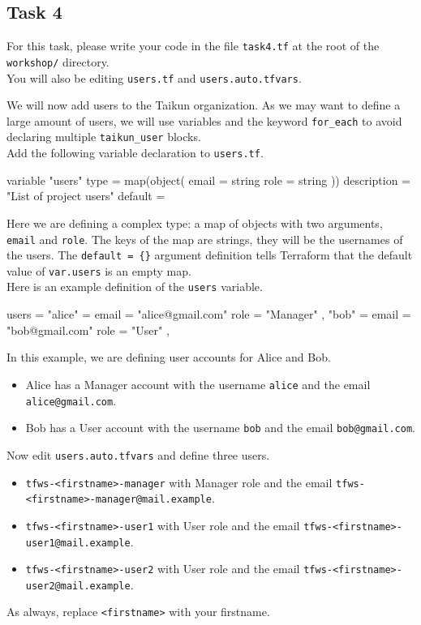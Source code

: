 \subsection{Task 4}\label{sec:task4}

\begin{note}
For this task, please write your code in the file \texttt{task4.tf}
at the root of the \texttt{workshop/} directory.\\
You will also be editing \texttt{users.tf} and \texttt{users.auto.tfvars}.
\end{note}

We will now add users to the Taikun organization.
As we may want to define a large amount of users, we will use variables
and the keyword \texttt{for\_each} to avoid declaring multiple \texttt{taikun\_user}
blocks.\\

Add the following variable declaration to \texttt{users.tf}.
\begin{tf}
variable "users" {
  type = map(object({
    email = string
    role  = string
  }))
  description = "List of project users"
  default     = {}
}
\end{tf}

Here we are defining a complex type: a map of objects with two arguments, \texttt{email} and \texttt{role}.
The keys of the map are strings, they will be the usernames of the users.
The \texttt{default = \{\}} argument definition tells Terraform that the default value of \texttt{var.users} is an empty map.\\

Here is an example definition of the \texttt{users} variable.
\begin{tf}
users = {
  "alice" = {
    email = "alice@gmail.com"
    role  = "Manager"
  },
  "bob" = {
    email = "bob@gmail.com"
    role  = "User"
  },
}
\end{tf}
In this example, we are defining user accounts for Alice and Bob.
\begin{itemize}
  \item Alice has a Manager account with the username \texttt{alice} and the email \texttt{alice@gmail.com}.
  \item Bob has a User account with the username \texttt{bob} and the email \texttt{bob@gmail.com}.
\end{itemize}
Now edit \texttt{users.auto.tfvars} and define three users.
\begin{itemize}
  \item \texttt{tfws-<firstname>-manager} with Manager role and the email \texttt{tfws-<firstname>-manager@mail.example}.
  \item \texttt{tfws-<firstname>-user1} with User role and the email \texttt{tfws-<firstname>-user1@mail.example}.
  \item \texttt{tfws-<firstname>-user2} with User role and the email \texttt{tfws-<firstname>-user2@mail.example}.
\end{itemize}
As always, replace \texttt{<firstname>} with your firstname.\\

